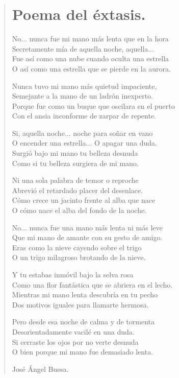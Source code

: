 \documentclass[11pt, portrait, twoside, notitlepage, openright]{book}
\begin{document}
\newpage
\begin{verse}
\begin{center}
\section{Poema del éxtasis.}
\end{center}
No... nunca fue mi mano más lenta que en la hora\\
Secretamente mía de aquella noche, aquella...\\
Fue así como una nube cuando oculta una estrella\\
O así como una estrella que se pierde en la aurora.
\newline

Nunca tuvo mi mano más quietud impaciente,\\
Semejante a la mano de un ladrón inexperto.\\
Porque fue como un buque que oscilara en el puerto\\
Con el ansia inconforme de zarpar de repente.
\newline

Si, aquella noche... noche para soñar en vano\\
O encender una estrella... O apagar una duda.\\
Surgió bajo mi mano tu belleza desnuda\\
Como si tu belleza surgiera de mi mano.
\newline

Ni una sola palabra de temor o reproche\\
Abrevió el retardado placer del desenlace.\\
Cómo crece un jacinto frente al alba que nace\\
O cómo nace el alba del fondo de la noche.
\newline

No... nunca fue una mano más lenta ni más leve\\
Que mi mano de amante con su gesto de amigo.\\
Eras como la nieve cayendo sobre el trigo\\
O un trigo milagroso brotando de la nieve.
\newpage

Y tu estabas inmóvil bajo la selva rosa\\
Como una flor fantástica que se abriera en el lecho.\\
Mientras mi mano lenta descubría en tu pecho\\
Dos motivos iguales para llamarte hermosa.
\newline

Pero desde esa noche de calma y de tormenta\\
Desorientadamente vacilé en una duda.\\
Si cerraste los ojos por no verte desnuda\\
O bien porque mi mano fue demasiado lenta.
\newline

José Ángel Buesa.
\end{verse}
\end{document}
